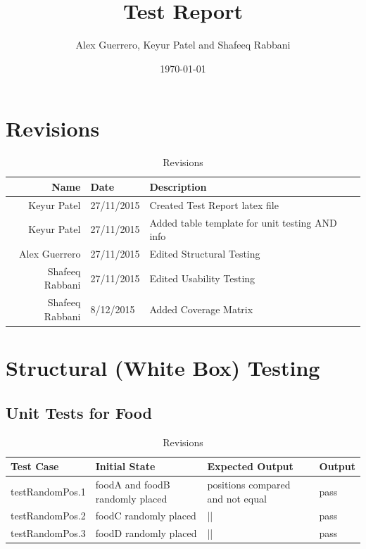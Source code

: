 \documentclass[12pt]{article}
\begin{document}
\title{Test Report} 
\author{Alex Guerrero, Keyur Patel and Shafeeq Rabbani}
\date{\today}

\maketitle

\section{Revisions}
\begin{center}
	\begin{longtable}{ | r | p{4cm} | p{4cm} | p{4cm} |}
	\caption{Revisions} \\ \hline \label{TblInputVar} 
	Name & Date & Description\\ \hline
	Keyur Patel & 27/11/2015 &  Created Test Report latex file\\ \hline

	Keyur Patel & 27/11/2015 &  Added table template for unit testing AND info\\ \hline

	Alex Guerrero & 27/11/2015 & Edited Structural Testing\\ \hline
	
		Shafeeq Rabbani & 27/11/2015 & Edited Usability Testing\\ \hline
		Shafeeq Rabbani & 8/12/2015 & Added Coverage Matrix\\ \hline
	\end{longtable}
\end{center}

\section{Structural (White Box) Testing}

\subsection{Unit Tests for Food}

\begin{center}
	\begin{longtable}{ | p{3cm} | p{4cm} | p{4cm} | p{2cm} |}
	\caption{Revisions} \\ \hline \label{TblInputVar} 
	Test Case & Initial State & Expected Output & Output\\ \hline
	testRandomPos.1 & foodA and foodB randomly placed & positions compared and not equal & pass  \\ \hline
	testRandomPos.2 & foodC randomly placed & || & pass  \\ \hline
	testRandomPos.3 & foodD randomly placed & || & pass  \\ \hline

	\end{longtable}
\end{center}
\end{document}
